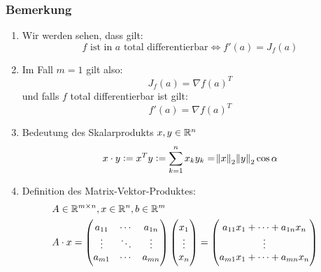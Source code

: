 \subsubsection{Bemerkung}
\begin{enumerate}[label= (\alph*)]
    \item Wir werden sehen, dass gilt:
        \begin{equation*}
            f \text{ ist in }a\text{ total differentierbar} \Leftrightarrow
            f'(a) = J_f(a)
        \end{equation*}
    \item Im Fall $m=1$ gilt also:
        \begin{equation*}
            J_f(a) = \nabla {f(a)}^T
        \end{equation*}
        und falls $f$ total differentierbar ist gilt:
        \begin{equation*}
            f'(a) = \nabla {f(a)}^T
        \end{equation*}
    \item Bedeutung des Skalarprodukts $x,y \in \mathbb{R}^n$
        \begin{equation*}
            x \cdot y := x^T y := \sum_{k=1}^n x_k y_k = \norm{x}_2 \norm{y}_2
            \cos{\alpha}
        \end{equation*}
    \item Definition des Matrix-Vektor-Produktes:
        \begin{eqnarray*}
            &A \in \mathbb{R}^{m \times n}, x \in \mathbb{R}^n, b \in \mathbb{R}^m&\\
            &A \cdot x =
            \begin{pmatrix}
                a_{11} & \cdots & a_{1n}\\
                \vdots & \ddots  & \vdots \\
                a_{m1} & \cdots & a_{mn}
            \end{pmatrix}
            \begin{pmatrix}
                x_1 \\ \vdots \\ x_n
            \end{pmatrix}
            =
            \begin{pmatrix}
                a_{11} x_1 + \cdots + a_{1n} x_n\\
                \vdots \\
                a_{m1} x_1 + \cdots + a_{mn} x_n
            \end{pmatrix}&
        \end{eqnarray*}
\end{enumerate}


